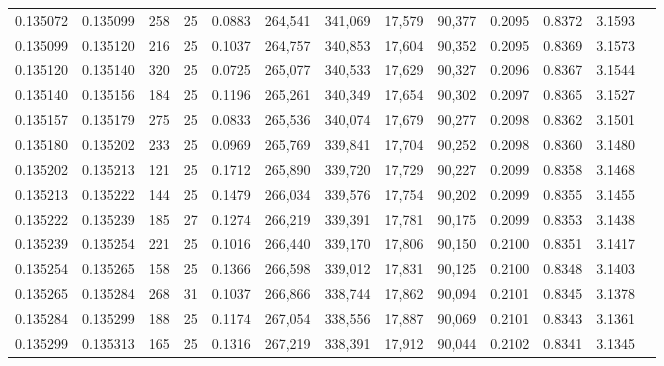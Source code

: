 \begin{tabular}{rrrrrrrrrrrrr}
0.135072 & 0.135099 &   258 &  25 &                                     0.0883 & 264,541 & 341,069 &  17,579 &  90,377 & 0.2095 & 0.8372 & 3.1593 \\
0.135099 & 0.135120 &   216 &  25 &                                     0.1037 & 264,757 & 340,853 &  17,604 &  90,352 & 0.2095 & 0.8369 & 3.1573 \\
0.135120 & 0.135140 &   320 &  25 &                                     0.0725 & 265,077 & 340,533 &  17,629 &  90,327 & 0.2096 & 0.8367 & 3.1544 \\
0.135140 & 0.135156 &   184 &  25 &                                     0.1196 & 265,261 & 340,349 &  17,654 &  90,302 & 0.2097 & 0.8365 & 3.1527 \\
0.135157 & 0.135179 &   275 &  25 &                                     0.0833 & 265,536 & 340,074 &  17,679 &  90,277 & 0.2098 & 0.8362 & 3.1501 \\
0.135180 & 0.135202 &   233 &  25 &                                     0.0969 & 265,769 & 339,841 &  17,704 &  90,252 & 0.2098 & 0.8360 & 3.1480 \\
0.135202 & 0.135213 &   121 &  25 &                                     0.1712 & 265,890 & 339,720 &  17,729 &  90,227 & 0.2099 & 0.8358 & 3.1468 \\
0.135213 & 0.135222 &   144 &  25 &                                     0.1479 & 266,034 & 339,576 &  17,754 &  90,202 & 0.2099 & 0.8355 & 3.1455 \\
0.135222 & 0.135239 &   185 &  27 &                                     0.1274 & 266,219 & 339,391 &  17,781 &  90,175 & 0.2099 & 0.8353 & 3.1438 \\
0.135239 & 0.135254 &   221 &  25 &                                     0.1016 & 266,440 & 339,170 &  17,806 &  90,150 & 0.2100 & 0.8351 & 3.1417 \\
0.135254 & 0.135265 &   158 &  25 &                                     0.1366 & 266,598 & 339,012 &  17,831 &  90,125 & 0.2100 & 0.8348 & 3.1403 \\
0.135265 & 0.135284 &   268 &  31 &                                     0.1037 & 266,866 & 338,744 &  17,862 &  90,094 & 0.2101 & 0.8345 & 3.1378 \\
0.135284 & 0.135299 &   188 &  25 &                                     0.1174 & 267,054 & 338,556 &  17,887 &  90,069 & 0.2101 & 0.8343 & 3.1361 \\
0.135299 & 0.135313 &   165 &  25 &                                     0.1316 & 267,219 & 338,391 &  17,912 &  90,044 & 0.2102 & 0.8341 & 3.1345 \\

\end{tabular}
